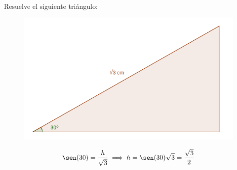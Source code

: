 \documentclass[palatino,nosec]{Docencia}
\begin{document}
\begin{problem}
Resuelve el siguiente triángulo:


\solution
\begin{figure}[h]
\centering
\includegraphics[scale=0.3]{Triang}
\end{figure}

\[
	\sen(30) = \frac{h}{\sqrt{3}} \implies h = \sen(30)\sqrt{3} = \frac{\sqrt{3}}{2}
\]
\end{problem}
\end{document}
